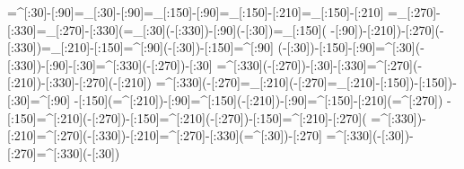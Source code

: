 =^[:30]-[:90]=_[:30]-[:90]=_[:150]-[:90]=_[:150]-[:210]=_[:150]-[:210]%
=_[:270]-[:330]=_[:270]-[:330](=_[:30](-[:330])-[:90](-[:30])=_[:150](%
-[:90])-[:210])-[:270](-[:330])=_[:210]-[:150]=^[:90](-[:30])-[:150]=^[:90]%
(-[:30])-[:150]-[:90]=^[:30](-[:330])-[:90]-[:30]=^[:330](-[:270])-[:30]%
=^[:330](-[:270])-[:30]-[:330]=^[:270](-[:210])-[:330]-[:270](-[:210])%
=^[:330](-[:270]=_[:210](-[:270]=_[:210]-[:150])-[:150])-[:30]=^[:90]%
-[:150](=^[:210])-[:90]=^[:150](-[:210])-[:90]=^[:150]-[:210](=^[:270])%
-[:150]=^[:210](-[:270])-[:150]=^[:210](-[:270])-[:150]=^[:210]-[:270](%
=^[:330])-[:210]=^[:270](-[:330])-[:210]=^[:270]-[:330](=^[:30])-[:270]%
=^[:330](-[:30])-[:270]=^[:330](-[:30])